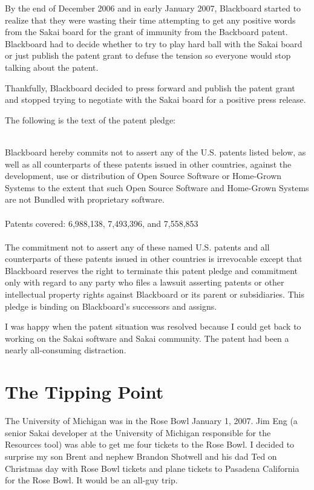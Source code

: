 \documentclass[12pt]{book}
\begin{document}
By the end of December 2006 and in early January 2007,
Blackboard started to realize
that they were wasting their time attempting to get any
positive words from the Sakai board
for the grant of immunity from the Backboard patent.  Blackboard had to
decide whether to try to play hard ball with the Sakai board
or just publish the patent grant to defuse the tension so
everyone would stop talking about the patent.

Thankfully, Blackboard decided to press forward and publish
the patent grant and stopped trying to negotiate with the
Sakai board for a positive press release.

The following is the text of the patent pledge:\\
\\
\begin{sf}
Blackboard hereby commits not to assert any of the U.S.
patents listed below, as well as all counterparts of
these patents issued in other countries, against the
development, use or distribution of Open Source Software
or Home-Grown Systems to the extent that such Open Source
Software and Home-Grown Systems are not Bundled with proprietary
software.\\
\\
Patents covered: 6,988,138,  7,493,396, and 7,558,853\\
\\
The commitment not to assert any of these named U.S. patents
and all counterparts of these patents issued in
other countries is irrevocable except that Blackboard reserves
the right to terminate this patent pledge and commitment only
with regard to any party who files a lawsuit asserting patents
or other intellectual property rights against Blackboard or its
parent or subsidiaries. This pledge is binding on Blackboard's
successors and assigns.\\
\end{sf}

I was happy when the patent situation was resolved because
I could get back to working on the Sakai software and Sakai
community.  The patent had been a nearly all-consuming distraction.

\chapter{The Tipping Point}

The University of Michigan was in the Rose Bowl January 1, 2007.  Jim Eng
(a senior Sakai developer at the University of Michigan responsible for the Resources tool) was able
to get me four tickets to the Rose Bowl.  I decided to surprise my son Brent
and nephew Brandon Shotwell and his dad Ted on Christmas day with Rose Bowl tickets and
plane tickets to Pasadena California for the Rose Bowl.  It would be an all-guy
trip.
\end{document}
